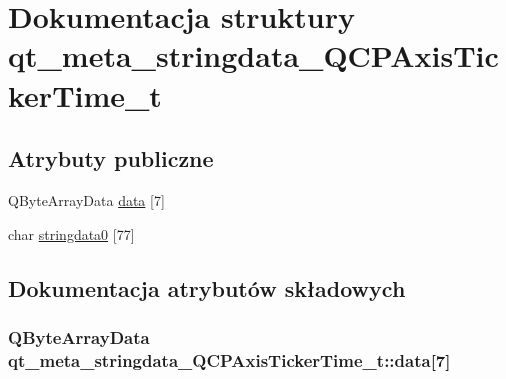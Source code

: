 \hypertarget{structqt__meta__stringdata___q_c_p_axis_ticker_time__t}{}\section{Dokumentacja struktury qt\+\_\+meta\+\_\+stringdata\+\_\+\+Q\+C\+P\+Axis\+Ticker\+Time\+\_\+t}
\label{structqt__meta__stringdata___q_c_p_axis_ticker_time__t}
\subsection*{Atrybuty publiczne}
\begin{DoxyCompactItemize}
\item 
Q\+Byte\+Array\+Data \hyperlink{structqt__meta__stringdata___q_c_p_axis_ticker_time__t_a0e812edae0b72b531ae152e0bed2a3f5}{data} \mbox{[}7\mbox{]}
\item 
char \hyperlink{structqt__meta__stringdata___q_c_p_axis_ticker_time__t_aad085a5c9bf7f31e1826758e85aebe4e}{stringdata0} \mbox{[}77\mbox{]}
\end{DoxyCompactItemize}


\subsection{Dokumentacja atrybutów składowych}
\subsubsection[{\texorpdfstring{data}{data}}]{\setlength{\rightskip}{0pt plus 5cm}Q\+Byte\+Array\+Data qt\+\_\+meta\+\_\+stringdata\+\_\+\+Q\+C\+P\+Axis\+Ticker\+Time\+\_\+t\+::data\mbox{[}7\mbox{]}}\hypertarget{structqt__meta__stringdata___q_c_p_axis_ticker_time__t_a0e812edae0b72b531ae152e0bed2a3f5}{}\label{structqt__meta__stringdata___q_c_p_axis_ticker_time__t_a0e812edae0b72b531ae152e0bed2a3f5}
